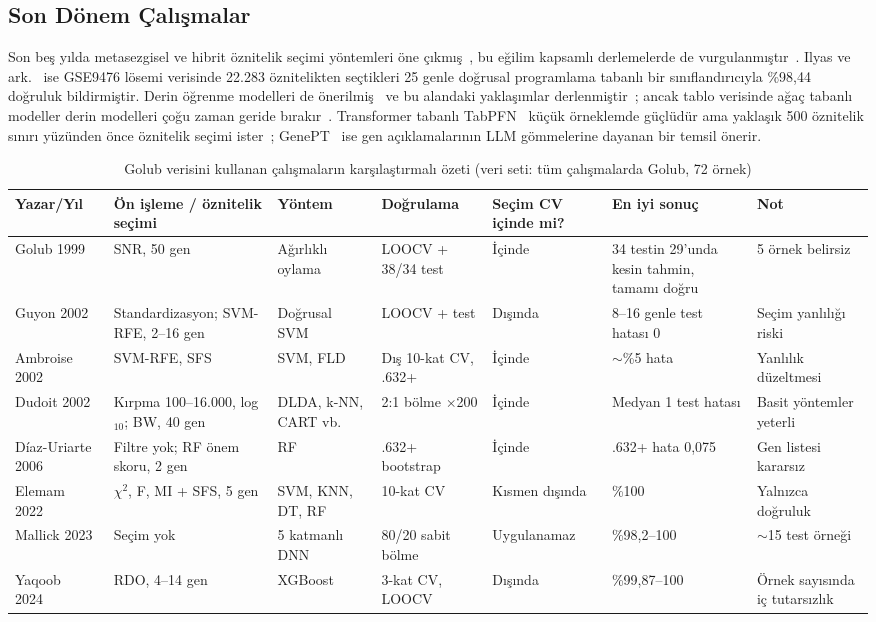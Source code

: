 \documentclass[conference]{IEEEtran}
\begin{document}
\subsection{Son Dönem Çalışmalar}
Son beş yılda metasezgisel ve hibrit öznitelik seçimi yöntemleri öne çıkmış~\cite{elemam2022,yaqoob2024}, bu eğilim kapsamlı derlemelerde de vurgulanmıştır~\cite{almazrua2022,osama2023}. Ilyas ve ark.~\cite{ilyas2023} ise GSE9476 lösemi verisinde 22.283 öznitelikten seçtikleri 25 genle doğrusal programlama tabanlı bir sınıflandırıcıyla \%98,44 doğruluk bildirmiştir. Derin öğrenme modelleri de önerilmiş~\cite{mallick2023} ve bu alandaki yaklaşımlar derlenmiştir~\cite{alharbi2023}; ancak tablo verisinde ağaç tabanlı modeller derin modelleri çoğu zaman geride bırakır~\cite{grinsztajn2022}. Transformer tabanlı TabPFN~\cite{hollmann2025} küçük örneklemde güçlüdür ama yaklaşık 500 öznitelik sınırı yüzünden önce öznitelik seçimi ister~\cite{zhou2025}; GenePT~\cite{chen2024} ise gen açıklamalarının LLM gömmelerine dayanan bir temsil önerir.

\begin{table}[t]
\caption{Golub verisini kullanan çalışmaların karşılaştırmalı özeti (veri seti: tüm çalışmalarda Golub, 72 örnek)}
\label{tab:lit}
\centering
\scriptsize
\begin{tabularx}{\textwidth}{@{}l L l l l L L@{}}
\toprule
Yazar/Yıl & Ön işleme / öznitelik seçimi & Yöntem & Doğrulama & Seçim CV içinde mi? & En iyi sonuç & Not \\
\midrule
Golub 1999~\cite{golub1999} & SNR, 50 gen & Ağırlıklı oylama & LOOCV + 38/34 test & İçinde & 34 testin 29'unda kesin tahmin, tamamı doğru & 5 örnek belirsiz \\
Guyon 2002~\cite{guyon2002} & Standardizasyon; SVM-RFE, 2--16 gen & Doğrusal SVM & LOOCV + test & Dışında & 8--16 genle test hatası 0 & Seçim yanlılığı riski \\
Ambroise 2002~\cite{ambroise2002} & SVM-RFE, SFS & SVM, FLD & Dış 10-kat CV, .632+ & İçinde & $\sim$\%5 hata & Yanlılık düzeltmesi \\
Dudoit 2002~\cite{dudoit2002} & Kırpma 100--16.000, log$_{10}$; BW, 40 gen & DLDA, k-NN, CART vb. & 2:1 bölme $\times$200 & İçinde & Medyan 1 test hatası & Basit yöntemler yeterli \\
Díaz-Uriarte 2006~\cite{diaz2006} & Filtre yok; RF önem skoru, 2 gen & RF & .632+ bootstrap & İçinde & .632+ hata 0,075 & Gen listesi kararsız \\
Elemam 2022~\cite{elemam2022} & $\chi^2$, F, MI + SFS, 5 gen & SVM, KNN, DT, RF & 10-kat CV & Kısmen dışında & \%100 & Yalnızca doğruluk \\
Mallick 2023~\cite{mallick2023} & Seçim yok & 5 katmanlı DNN & 80/20 sabit bölme & Uygulanamaz & \%98,2--100 & $\sim$15 test örneği \\
Yaqoob 2024~\cite{yaqoob2024} & RDO, 4--14 gen & XGBoost & 3-kat CV, LOOCV & Dışında & \%99,87--100 & Örnek sayısında iç tutarsızlık \\
\bottomrule
\end{tabularx}
\end{table}
\end{document}
